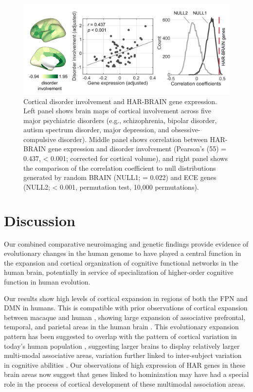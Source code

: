 \begin{refsection}
\begin{figure}[h]
    \centering
    \includegraphics[width=\linewidth]{images/harFig7.png}
    \caption{Cortical disorder involvement and HAR-BRAIN gene expression. Left panel shows brain maps of cortical involvement across five major psychiatric disorders (e.g., schizophrenia, bipolar disorder, autism spectrum disorder, major depression, and obsessive-compulsive disorder). Middle panel shows correlation between HAR-BRAIN gene expression and disorder involvement (Pearson's \rvaldf(55) = 0.437, \pval < 0.001; corrected for cortical volume), and right panel shows the comparison of the correlation coefficient to null distributions generated by random BRAIN (NULL1; \pval = 0.022) and ECE genes (NULL2; \pval < 0.001, permutation test, 10,000 permutations).}
    \label{harFig7}
\end{figure}

\section*{Discussion}
Our combined comparative neuroimaging and genetic findings provide evidence of evolutionary changes in the human genome to have played a central function in the expansion and cortical organization of cognitive functional networks in the human brain, potentially in service of specialization of higher-order cognitive function in human evolution.

Our results show high levels of cortical expansion in regions of both the FPN and DMN in humans. This is compatible with prior observations of cortical expansion between macaque and human \citep{hill2010similar}, showing large expansion of associative prefrontal, temporal, and parietal areas in the human brain \citep{hill2010similar,donahue2018quantitative}. This evolutionary expansion pattern has been suggested to overlap with the pattern of cortical variation in today’s human population \citep{reardon2018normative}, suggesting larger brains to display relatively larger multi-modal associative areas, variation further linked to inter-subject variation in cognitive abilities \citep{Ryu256313}. Our observations of high expression of HAR genes in these brain areas now suggest that genes linked to hominization may have had a special role in the process of cortical development of these multimodal association areas.


\end{refsection}

